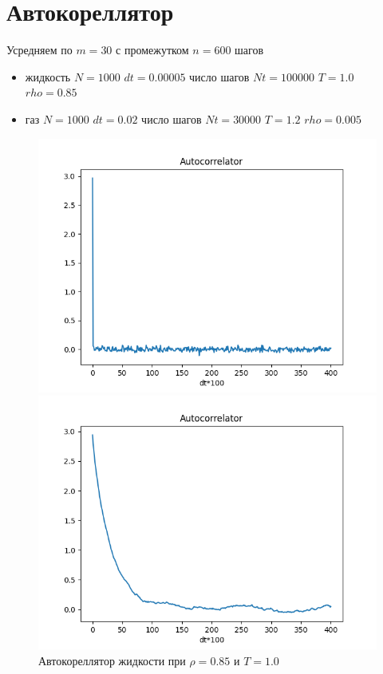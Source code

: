 \documentclass[a4paper]{article}
\begin{document}
\section{Автокореллятор} %
Усредняем по $m=30$ с промежутком $n=600$ шагов 
\label{sec:автокореллятор}
\begin{itemize}
\item жидкость $N=1000$ $dt=0.00005$ число шагов $Nt=100000$ $T=1.0$ $rho=0.85$   
\item газ $N=1000$ $dt=0.02$ число шагов $Nt=30000$ $T=1.2$ $rho=0.005$

\end{itemize}

\begin{figure}[h]
\begin{center}
\begin{minipage}[h]{0.45\linewidth}
\includegraphics[width=1.1\linewidth]{vacfl.png}
\caption{Автокореллятор жидкости при $\rho=0.85$ и $T= 1.0$ } %
\label{ris:experimoriginal} %
\end{minipage}
\hfill
\begin{minipage}[h]{0.45\linewidth}
\begin{center}
\includegraphics[width=1.1\textwidth]{vacf.png}

\end{center}
\end{minipage}
\end{center}
\end{figure}
\end{document}
